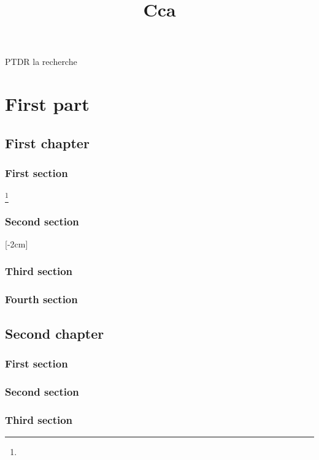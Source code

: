 \documentclass{researchbook}
\title{Cca}
\begin{document}
\maketitle
\newpage

PTDR la recherche

\tableofcontents


\part{First part}
\chapter{First chapter}

\section{First section}\lipsum

\footnote{\lipsum}

\section{Second section}\lipsum
\reversemarginpar{}[-2cm]
\section{Third section}\lipsum
\section{Fourth section}\lipsum

\chapter{Second chapter}

\section{First section}\lipsum
\section{Second section}\lipsum
\section{Third section}\lipsum
\end{document}
